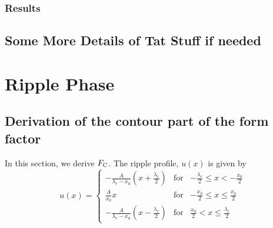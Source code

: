 \subsection{Results}

\section{Some More Details of Tat Stuff if needed}

\chapter{Ripple Phase}
\section{Derivation of the contour part of the form factor}
In this section, we derive $F_\mathrm{C}$. The ripple profile, $u(x)$ is given by
\begin{equation}
  u(x) = \left\{
    \begin{array}{ccc}
    -\frac{A}{\lambda_r-x_0}\left(x+\frac{\lambda_r}{2}\right) 
      & \text{for} 
      & -\frac{\lambda_r}{2} \leq x < -\frac{x_0}{2} \\
    \frac{A}{x_0}x 
      & \text{for} 
      & -\frac{x_0}{2} \leq x \leq \frac{x_0}{2} \\
    -\frac{A}{\lambda_r-x_0} \left(x-\frac{\lambda_r}{2}\right)
      & \text{for} 
      & \frac{x_0}{2} < x \leq \frac{\lambda_r}{2}
    \end{array} \right.
\end{equation}

